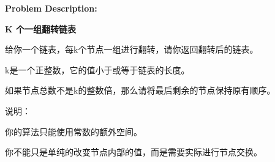 \textbf{Problem Description:}\par

\textbf{K 个一组翻转链表}\par

给你一个链表，每k个节点一组进行翻转，请你返回翻转后的链表。\par

k是一个正整数，它的值小于或等于链表的长度。\par

如果节点总数不是k的整数倍，那么请将最后剩余的节点保持原有顺序。\par

说明：\par

你的算法只能使用常数的额外空间。\par

你不能只是单纯的改变节点内部的值，而是需要实际进行节点交换。\par
